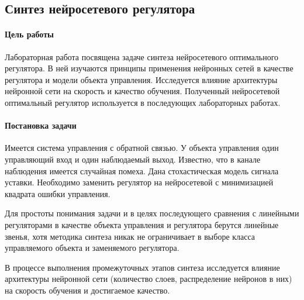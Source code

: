 
\subsection{Синтез нейросетевого регулятора}

\paragraph{Цель работы}

Лабораторная работа посвящена задаче синтеза нейросетевого
оптимального регулятора.  В ней изучаются принципы применения
нейронных сетей в качестве регулятора и модели объекта управления.
Исследуется влияние архитектуры нейронной сети на скорость и качество
обучения.  Полученный нейросетевой оптимальный регулятор используется
в последующих лабораторных работах.

\paragraph{Постановка задачи}

Имеется система управления с обратной связью.  У объекта управления
один управляющий вход и один наблюдаемый выход.  Известно, что в
канале наблюдения имеется случайная помеха.  Дана стохастическая
модель сигнала уставки.  Необходимо заменить регулятор на нейросетевой
с минимизацией квадрата ошибки управления.

Для простоты понимания задачи и в целях последующего сравнения с
линейными регуляторами в качестве объекта управления и регулятора
берутся линейные звенья, хотя методика синтеза никак не ограничивает в
выборе класса управляемого объекта и заменяемого регулятора.

В процессе выполнения промежуточных этапов синтеза исследуется влияние
архитектуры нейронной сети (количество слоев, распределение нейронов в
них) на скорость обучения и достигаемое качество.

